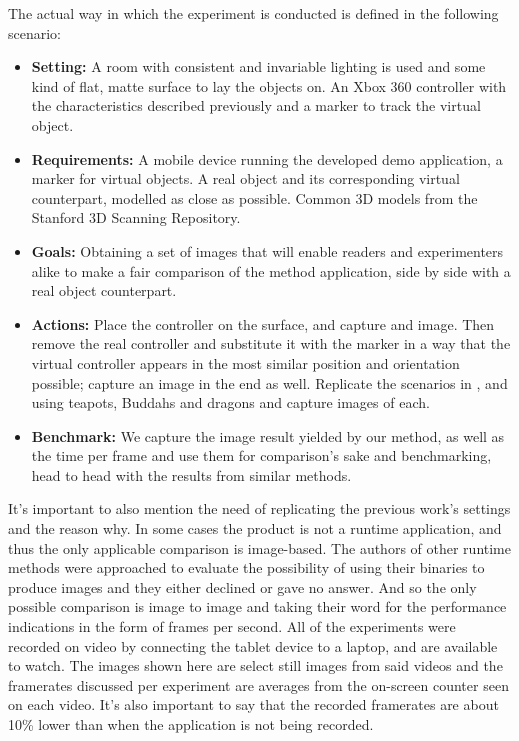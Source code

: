 The actual way in which the experiment is conducted is defined in the following scenario:
\begin{itemize}
    \item \textbf{Setting:} A room with consistent and invariable lighting is used and some kind of flat, matte surface to lay the objects on. An Xbox 360 controller with the characteristics described previously and a marker to track the virtual object.
    \item \textbf{Requirements:} A mobile device running the developed demo application, a marker for virtual objects. A real object and its corresponding virtual counterpart, modelled as close as possible. Common 3D models from the Stanford 3D Scanning Repository.
    \item \textbf{Goals:} Obtaining a set of images that will enable readers and experimenters alike to make a fair comparison of the method application, side by side with a real object counterpart.
    \item \textbf{Actions:} Place the controller on the surface, and capture and image. Then remove the real controller and substitute it with the marker in a way that the virtual controller appears in the most similar position and orientation possible; capture an image in the end as well. Replicate the scenarios in \citet{kanbara2004}, \citet{karsh2014} and \citet{pessoa2011} using teapots, Buddahs and dragons and capture images of each.
     \item \textbf{Benchmark:} We capture the image result yielded by our method, as well as the time per frame and use them for comparison's sake and benchmarking, head to head with the results from similar methods.
\end{itemize}

It's important to also mention the need of replicating the previous work's settings and the reason why. In some cases the product is not a runtime application, and thus the only applicable comparison is image-based. The authors of other runtime methods were approached to evaluate the possibility of using their binaries to produce images and they either declined or gave no answer. And so the only possible comparison is image to image and taking their word for the performance indications in the form of frames per second.\newline
All of the experiments were recorded on video by connecting the tablet device to a laptop, and are available to watch. The images shown here are select still images from said videos and the framerates discussed per experiment are averages from the on-screen counter seen on each video. It's also important to say that the recorded framerates are about 10\% lower than when the application is not being recorded.\newline

